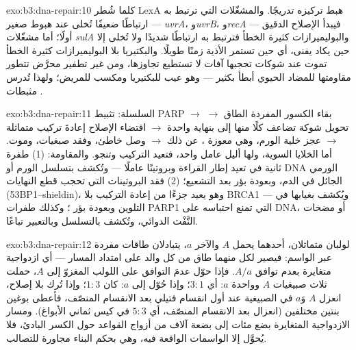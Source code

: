 \begin{solution}{exo:b3:dna-repair:10}
كلما شُطر LexA هبط تركيزه تدريجًا. والمشغّلات التي ترتبط به
ارتباطًا ضعيفًا تُخلى عند هبوط صغير --- \emph{uvrA}،
و\emph{uvrB}، و\emph{recA} --- فيبدأ الإصلاح الدقيق أولًا؛ أما
مشغّلات \emph{sulA} والبوليميرازات كثيرة الخطأ فترتبط به
ارتباطًا شديدًا ولا تُخلى إلا حين يكاد يفنى، أي حين
تستمر الأذية زمنًا طويلًا. والبكتيريا بلا البوليميرازات
كثيرة الخطأ تموت عند شوكات تحجبها آفات لا تستطيع
تجاوزها، ومن غير تطفير محرَّض تتطور مقاومتها للمضاد
الحيوي أبطأ بكثير --- وهو عيب للبكتيريا ومكسب
للمريض؛ ولهذا تُدرس مثبطات .
\end{solution}

\begin{solution}{exo:b3:dna-repair:11}
السلسلة: تثبيط PARP $\to$ بقاء الكسور المفردة الطاق $\to$ تحويل
شوكة تضاعف كلًا منها إلى  بنهاية واحدة
$\to$ اقتضاء الإصلاح إعادةَ تركيب متماثلة $\to$ عجز خلية الورم،
وهي معوزة ، عن ذلك $\to$ وصل خاطئ، وفقد صبغيات، وموت.
أما الخلايا السوية، ولها أليل عامل واحد، فتعيد التركيب وتنجو.
والمقاومة: (1) طفرة ثانية في \emph{} تعيد إطار القراءة
وبروتينًا عاملًا --- وتُكشف بتسلسل الورم أو
DNA الورمي الجائل في الدم، وبعودة بؤر  بعد
التشعيع؛ (2) فقد البروتينات التي تحجب قطع النهايات
(53BP1--shieldin)، وهو يعيد جزءًا من إعادة التركيب بلا BRCA1
--- ويُكشف بغيابها في التلوين وبعودة بؤر ؛
وكذلك طفرات PARP1 التي تمنع احتباسه على DNA، أو مضخات
النَّفْث الدوائي، وتُكشف بالتسلسل وبالتعبير تباعًا.
\end{solution}

\begin{solution}{exo:b3:dna-repair:12}
لولبان متماثلان، أحدهما يحمل $A$ والآخر $a$، يتبادلان
طاقات مفردة عبر الواسم: فيصير لكل منهما طاق من كل
والد على امتداد المسار --- أي ازدواجية متغايرة بعدم توافق $A/a$. فإذا
حوّل  عدمَ التوافق على اللولب المغزوّ إلى $A$،
حملت ثلاث صبيغيات $A$ وواحدة $a$: أي $3{:}1$؛ وإذا حُوّل إلى $a$:
كان $1{:}3$؛ وإذا تُرك بلا إصلاح، انعزل $A$ وَ$a$ في الصبيغية عند
أول انقسام فتيلي بعد الانقسام المنصّف، فأعطى بوغين بنتين مختلفين
(انعزال بعد الانقسام المنصّف، أي $5{:}3$ في كيس ثماني الأبواغ).
ومسار الازدواجية المتغايرة بضع مئات إلى بضعة آلاف من أزواج القواعد
حول الكسر البادئ، فلا يُحوَّل إلا الواسمات الواقعة فيه، وهي
بحكم البناء مجاورة للتصالب.
\end{solution}

